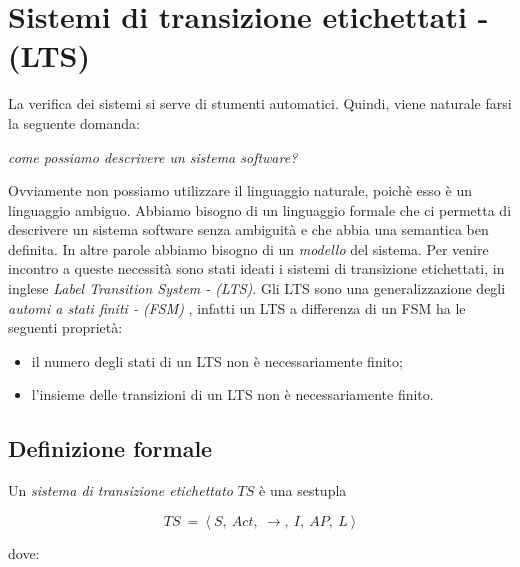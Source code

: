 \section{Sistemi di transizione etichettati - (LTS)}
La verifica dei sistemi si serve di stumenti automatici. Quindi, viene naturale farsi la seguente domanda:

\begin{center}
\emph{come possiamo descrivere un sistema software?}
\end{center}

Ovviamente non possiamo utilizzare il linguaggio naturale, poichè esso è un linguaggio ambiguo. Abbiamo bisogno di un linguaggio formale che ci permetta di descrivere un sistema software senza ambiguità e che abbia una semantica ben definita. In altre parole abbiamo bisogno di un \emph{modello} del sistema. Per venire incontro a queste necessità sono stati ideati i sistemi di transizione etichettati, in inglese \emph{Label Transition System - (LTS)}. Gli LTS sono una generalizzazione degli \emph{automi a stati finiti - (FSM)} \cite{NoteProf}, infatti un LTS a differenza di un FSM ha le seguenti proprietà:

\begin{itemize}
 \item il numero degli stati di un LTS non è necessariamente finito;
 \item l'insieme delle transizioni di un LTS non è necessariamente finito.
\end{itemize}

\subsection{Definizione formale}
Un \emph{sistema di transizione etichettato} $TS$ è una sestupla 

\begin{equation}
TS\ =\ \langle\ S,\ Act,\ \rightarrow,\ I,\ AP,\ L\ \rangle
\end{equation}

\noindent dove:

